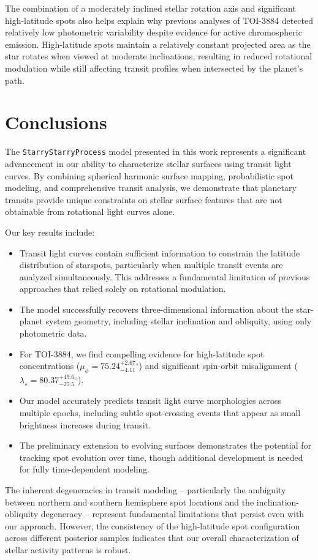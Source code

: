 \documentclass[twocolumn]{aastex631}
\begin{document}
The combination of a moderately inclined stellar rotation axis and significant high-latitude spots also helps explain why 
previous analyses of TOI-3884 detected relatively low photometric variability despite evidence for active chromospheric emission. 
High-latitude spots maintain a relatively constant projected area as the star rotates when viewed at moderate inclinations, 
resulting in reduced rotational modulation while still affecting transit profiles when intersected by the planet's path.

\section{Conclusions}
The \texttt{StarryStarryProcess} model presented in this work represents a significant advancement in our ability to characterize stellar surfaces using transit light curves. 
By combining spherical harmonic surface mapping, probabilistic spot modeling, and comprehensive transit analysis, we demonstrate that planetary transits provide unique constraints on 
stellar surface features that are not obtainable from rotational light curves alone.

Our key results include:
\begin{itemize}
    \item Transit light curves contain sufficient information to constrain the latitude distribution of starspots, particularly when multiple transit events are analyzed simultaneously. 
    This addresses a fundamental limitation of previous approaches that relied solely on rotational modulation.
    \item The model successfully recovers three-dimensional information about the star-planet system geometry, including stellar inclination and obliquity, using only photometric data. 
    \item For TOI-3884, we find compelling evidence for high-latitude spot concentrations ($\mu_\phi = 75.24^{+2.67}_{-4.11}$$^\circ$) and significant spin-orbit misalignment 
    ($\lambda_\star = 80.37^{+49.6}_{-27.5}$$^\circ$).
    \item Our model accurately predicts transit light curve morphologies across multiple epochs, including subtle spot-crossing events that appear as small brightness increases during transit.
    \item The preliminary extension to evolving surfaces demonstrates the potential for tracking spot evolution over time, though additional development is needed for fully time-dependent modeling.
\end{itemize}
The inherent degeneracies in transit modeling -- particularly the ambiguity between northern and southern hemisphere spot locations and the inclination-obliquity degeneracy -- represent fundamental 
limitations that persist even with our approach. However, the consistency of the high-latitude spot configuration across different posterior samples indicates that our overall 
characterization of stellar activity patterns is robust.
\end{document}
